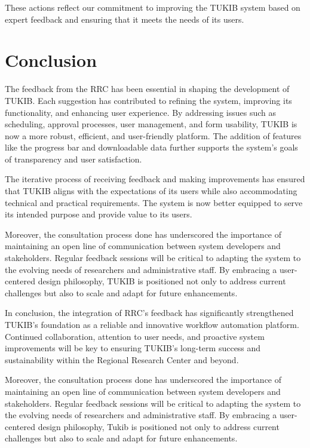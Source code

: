These actions reflect our commitment to improving the TUKIB system based on expert feedback and ensuring that it meets the needs of its users.

\section{Conclusion}
The feedback from the RRC has been essential in shaping the development of TUKIB. Each suggestion has contributed to refining the system, improving its functionality, and enhancing user experience. By addressing issues such as scheduling, approval processes, user management, and form usability, TUKIB is now a more robust, efficient, and user-friendly platform. The addition of features like the progress bar and downloadable data further supports the system’s goals of transparency and user satisfaction.

The iterative process of receiving feedback and making improvements has ensured that TUKIB aligns with the expectations of its users while also accommodating technical and practical requirements. The system is now better equipped to serve its intended purpose and provide value to its users.

Moreover, the consultation process done has underscored the importance of maintaining an open line of communication between system developers and stakeholders. Regular feedback sessions will be critical to adapting the system to the evolving needs of researchers and administrative staff. By embracing a user-centered design philosophy, TUKIB is positioned not only to address current challenges but also to scale and adapt for future enhancements.

In conclusion, the integration of RRC’s feedback has significantly strengthened TUKIB’s foundation as a reliable and innovative workflow automation platform. Continued collaboration, attention to user needs, and proactive system improvements will be key to ensuring TUKIB’s long-term success and sustainability within the Regional Research Center and beyond.

Moreover, the consultation process done has underscored the importance of maintaining an open line of communication between system developers and stakeholders. Regular feedback sessions will be critical to adapting the system to the evolving needs of researchers and administrative staff. By embracing a user-centered design philosophy, Tukib is positioned not only to address current challenges but also to scale and adapt for future enhancements.


